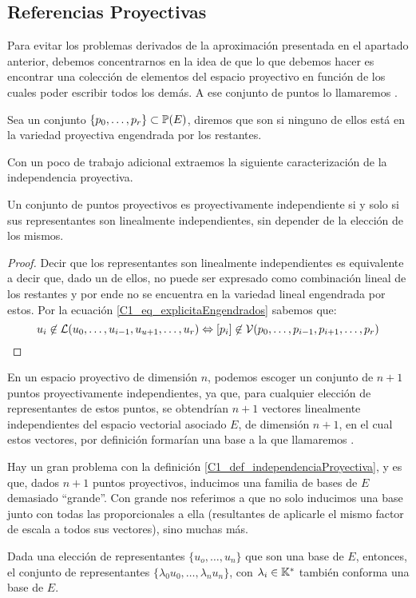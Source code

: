 \subsection{Referencias Proyectivas}
Para evitar los problemas derivados de la aproximación presentada en el apartado anterior, debemos concentrarnos en la idea de que lo que debemos hacer es encontrar una colección de elementos del espacio proyectivo en función de los cuales poder escribir todos los demás. A ese conjunto de puntos lo llamaremos .
\begin{defi}
	\label{C1_def_independenciaProyectiva}
	Sea un conjunto $\{p_0,\dots,p_r\}\subset\mathbb{P}(E)$, diremos que son  si ninguno de ellos está en la variedad proyectiva engendrada por los restantes.
\end{defi}
Con un poco de trabajo adicional extraemos la siguiente caracterización de la independencia proyectiva.
\begin{lem}
	\label{C1_lem_caracterizacionIndependencia}
	Un conjunto de puntos proyectivos es proyectivamente independiente si y solo si sus representantes son linealmente independientes, sin depender de la elección de los mismos. 
\end{lem}
\begin{proof}
	Decir que los representantes son linealmente independientes es equivalente a decir que, dado un de ellos, no puede ser expresado como combinación lineal de los restantes y por ende no se encuentra en la variedad lineal engendrada por estos. Por la ecuación \ref{C1_eq_explicitaEngendrados} sabemos que:
	\[u_i\not\in\mathcal{L}(u_0,\dots,u_{i-1},u_{u+1},\dots,u_{r})\Leftrightarrow\left [ p_i \right ]\not\in\mathcal{V}(p_0,\dots,p_{i-1},p_{i+1},\dots,p_r)\]
\end{proof}
\begin{obs}
	\label{C1_obs_baseInducida}
	En un espacio proyectivo de dimensión $n$, podemos escoger un conjunto de $n+1$ puntos proyectivamente independientes, ya que, para cualquier elección de representantes de estos puntos, se obtendrían $n+1$ vectores linealmente independientes del espacio vectorial asociado $E$, de dimensión $n+1$, en el cual estos vectores, por definición formarían una base a la que llamaremos .
\end{obs}
Hay un gran problema con la definición \ref{C1_def_independenciaProyectiva}, y es que, dados $n+1$ puntos proyectivos, inducimos una familia de bases de $E$ demasiado ``grande''. Con grande nos referimos a que no solo inducimos una base junto con todas las proporcionales a ella (resultantes de aplicarle el mismo factor de escala a todos sus vectores), sino muchas más.
\begin{obs}
	\label{C1_obs_noUnicidadBase}
	Dada una elección de representantes $\{u_o,\dots,u_n\}$ que son una base de $E$, entonces, el conjunto de representantes $\{\lambda_0u_0,\dots,\lambda_nu_n\}$, con $\lambda_i\in\mathbb{K}^*$ también conforma una base de $E$.
\end{obs}

